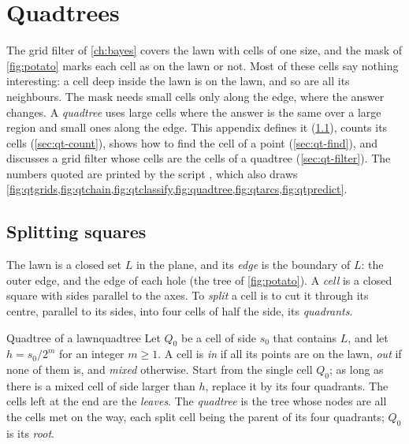 \chapter{Quadtrees}
\label{app:quadtree}

The grid filter of \cref{ch:bayes} covers the lawn with cells of one
size, and the mask of \cref{fig:potato} marks each cell as on the lawn or
not. Most of these cells say nothing interesting: a cell deep inside the
lawn is on the lawn, and so are all its neighbours. The mask needs small
cells only along the edge, where the answer changes. A \emph{quadtree}
uses large cells where the answer is the same over a large region and
small ones along the edge. This appendix defines it
(\cref{sec:qt-def}), counts its cells (\cref{sec:qt-count}), shows how to
find the cell of a point (\cref{sec:qt-find}), and discusses a grid
filter whose cells are the cells of a quadtree (\cref{sec:qt-filter}).
The numbers quoted are printed by the script
, which also draws
\cref{fig:qtgrids,fig:qtchain,fig:qtclassify,fig:quadtree,fig:qtarcs,fig:qtpredict}.

\section{Splitting squares}
\label{sec:qt-def}

The lawn is a closed set $L$ in the plane, and its \emph{edge} is the
boundary of $L$: the outer edge, and the edge of each hole (the tree of
\cref{fig:potato}). A \emph{cell} is a closed square with sides parallel
to the axes. To \emph{split} a cell is to cut it through its centre,
parallel to its sides, into four cells of half the side, its
\emph{quadrants}.

\begin{definition}{Quadtree of a lawn}{quadtree}
Let $Q_0$ be a cell of side $s_0$ that contains $L$, and let
$h=s_0/2^m$ for an integer $m\ge1$. A cell is \emph{in} if all its points
are on the lawn, \emph{out} if none of them is, and \emph{mixed}
otherwise. Start from the single cell $Q_0$; as long as there is a mixed
cell of side larger than $h$, replace it by its four quadrants. The cells
left at the end are the \emph{leaves}. The \emph{quadtree} is the tree
whose nodes are all the cells met on the way, each split cell being the
parent of its four quadrants; $Q_0$ is its \emph{root}.
\end{definition}

